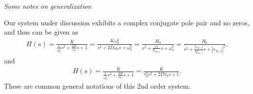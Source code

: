 \documentclass[11pt,a4paper,DIV=12]{scrartcl}
\numberwithin{equation}{section}
\numberwithin{figure}{section}
\begin{document}
\begin{mdframed}
\textit{Some notes on generalization}


Our system under discussion exhibits a complex conjugate pole pair and no zeros,
and thus can be given as
\begin{align}
H(s) =
\frac{K}{\frac{1}{\omega_0^2} s^2 + \frac{2 D}{\omega_0} s + 1}=
\frac{K \omega_0^2}{s^2 + 2 D \omega_0 s + \omega_0^2} =
\frac{H_0}{s^2 + \frac{\omega_0}{Q_{\infty,1}} s + \omega_0^2} =
\frac{H_0}{s^2 + \frac{|s_{\infty,1}|}{Q_{\infty,1}} s + |s_{\infty,1}|^2}.
\end{align}
and
\begin{align}
\label{eq:Hs_general}
H(s) = \frac{K}{\frac{1}{\omega_0^2} s^2 + \frac{2 D}{\omega_0} s + 1}
= \frac{K}{\tau_0^2 s^2 + 2 D \tau_0 s + 1}.
\end{align}
These are common general notations of this 2nd order system.


\end{mdframed}
\end{document}
